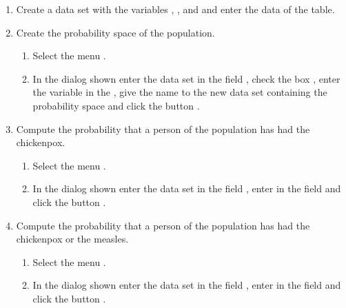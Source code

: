 \begin{enumerate}[leftmargin=*]
\begin{enumerate}
\item Create a data set  with the variables , ,
 and  and enter the data of the table. 

\item Create the probability space of the population.
\begin{indication}
\begin{enumerate}
\item Select the menu .
\item In the dialog shown enter the data set  in the field , check the box , enter the variable  in the , give the name
 to the new data set containing the probability space and click the button .
\end{enumerate}
\end{indication}  

\item Compute the probability that a person of the population has had the chickenpox. 
\begin{indication}
\begin{enumerate}
\item Select the menu .
\item In the dialog shown enter the data set  in the field , enter  in the field  and click the button .
\end{enumerate}
\end{indication} 

\item Compute the probability that a person of the population has had the chickenpox or the measles. 
\begin{indication}
\begin{enumerate}
\item Select the menu .
\item In the dialog shown enter the data set  in the field , enter
 in the field  and click the button .
\end{enumerate}
\end{indication} 


\end{enumerate}
\end{enumerate}
